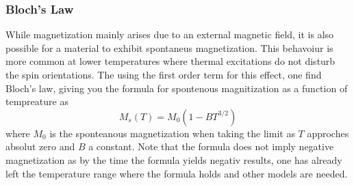 \subsubsection{Bloch's Law}
While magnetization mainly arises due to an external magnetic field, it is also possible for a material to exhibit spontaneus magnetization. This 
behavoiur is more common at lower temperatures where thermal excitations do not disturb the spin orientations. The using the first order term for this 
effect, one find Bloch's law, giving you the formula for spontenous magnitization as a function of tempreature as \begin{equation} M_s(T)=M_0(1-BT^{3/2})
 \end{equation} where $M_0$ is the sponteanous magnetization when taking the limit as $T$ approches absolut zero and $B$ a constant. Note that the 
 formula does not imply negative magnetization as by the time the formula yields negativ results, one has already left the temperature range where the 
 formula holds and other models are needed. \cite{della2005extension} %


    
    

